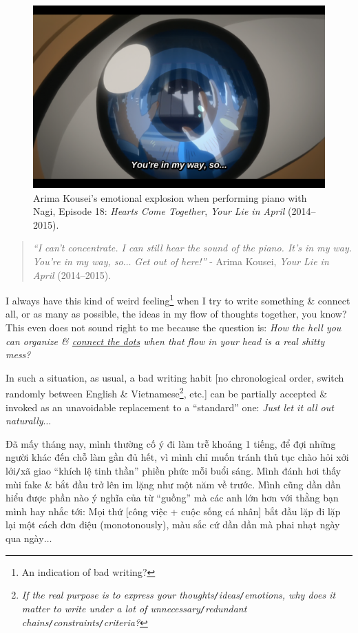\documentclass[12pt,oneside]{book}
\begin{document}
\begin{figure}[H]
	\centering
	\includegraphics[width = 12cm]{Arima_Kousei_you_are_in_my_way}
	\caption{Arima Kousei's emotional explosion when performing piano with Nagi, Episode 18: {\it Hearts Come Together}, {\it Your Lie in April} (2014--2015).}
	\label{fig2}
\end{figure}

\begin{quotation}
	{\it``I can't concentrate. I can still hear the sound of the piano. It's in my way. You're in my way, so$\ldots$ Get out of here!''} - Arima Kousei, {\it Your Lie in April} (2014--2015).
\end{quotation}

I always have this kind of weird feeling\footnote{An indication of bad writing?} when I try to write something \& connect all, or as many as possible, the ideas in my flow of thoughts together, you know? This even does not sound right to me because the question is: {\it How the hell you can organize \& \href{https://en.wikipedia.org/wiki/Connect_the_dots}{connect the dots} when that flow in your head is a real shitty mess?}

In such a situation, as usual, a bad writing habit [no chronological order, switch randomly between English \& Vietnamese\footnote{{\it If the real purpose is to express your thoughts{\tt/}ideas{\tt/}emotions, why does it matter to write under a lot of unnecessary{\tt/}redundant chains{\tt/}constraints{\tt/}criteria?}}, etc.] can be partially accepted \& invoked as an unavoidable replacement to a ``standard'' one: {\it Just let it all out naturally$\ldots$}

Đã mấy tháng nay, mình thường cố ý đi làm trễ khoảng 1 tiếng, để đợi những người khác đến chỗ làm gần đủ hết, vì mình chỉ muốn tránh thủ tục chào hỏi xởi lởi{\tt/}xã giao ``khích lệ tinh thần'' phiền phức mỗi buổi sáng. Mình đánh hơi thấy mùi fake \& bắt đầu trở lên im lặng như một năm về trước. Mình cũng dần dần hiểu được phần nào ý nghĩa của từ ``guồng'' mà các anh lớn hơn với thằng bạn mình hay nhắc tới: Mọi thứ [công việc + cuộc sống cá nhân] bắt đầu lặp đi lặp lại một cách đơn điệu (monotonously), màu sắc cứ dần dần mà phai nhạt ngày qua ngày$\ldots$
\end{document}
